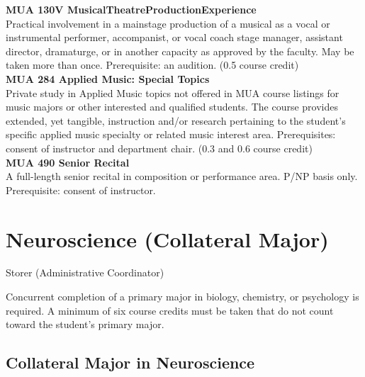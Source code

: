 \documentclass[
  letterpaper,
]{scrbook}
\begin{document}
\textbf{MUA 130V MusicalTheatreProductionExperience}\\
Practical involvement in a mainstage production of a musical as a vocal
or instrumental performer, accompanist, or vocal coach stage manager,
assistant director, dramaturge, or in another capacity as approved by
the faculty. May be taken more than once. Prerequisite: an audition.
(0.5 course credit)\\
\textbf{MUA 284 Applied Music: Special Topics}\\
Private study in Applied Music topics not offered in MUA course listings
for music majors or other interested and qualified students. The course
provides extended, yet tangible, instruction and/or research pertaining
to the student's specific applied music specialty or related music
interest area. Prerequisites: consent of instructor and department
chair. (0.3 and 0.6 course credit)\\
\textbf{MUA 490 Senior Recital}\\
A full-length senior recital in composition or performance area. P/NP
basis only. Prerequisite: consent of instructor.

\section{Neuroscience (Collateral Major)}\label{sec-neuroscience}

Storer (Administrative Coordinator)

Concurrent completion of a primary major in biology, chemistry, or
psychology is required. A minimum of six course credits must be taken
that do not count toward the student's primary major.

\subsection{Collateral Major in
Neuroscience}\label{collateral-major-in-neuroscience}
\end{document}
